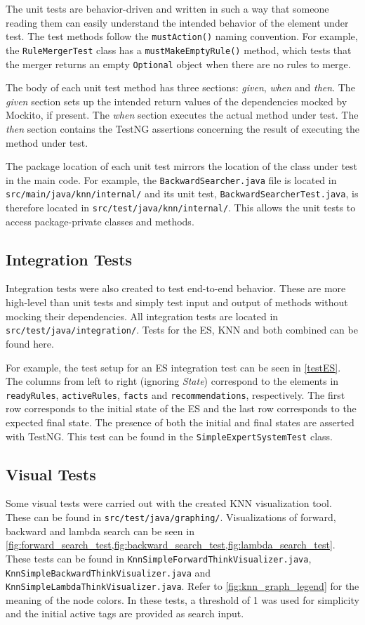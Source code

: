 \documentclass[titlepage,11pt]{article}
\newcommand{\code}[1]{\texttt{#1}}
\begin{document}
The unit tests are behavior-driven and written in such a way that someone reading them can easily understand the intended behavior of the element under test. The test methods follow the \code{mustAction()} naming convention. For example, the \code{RuleMergerTest} class has a \code{mustMakeEmptyRule()} method, which tests that the merger returns an empty \code{Optional} object when there are no rules to merge.

The body of each unit test method has three sections: \emph{given}, \emph{when} and \emph{then}. The \emph{given} section sets up the intended return values of the dependencies mocked by Mockito, if present. The \emph{when} section executes the actual method under test. The \emph{then} section contains the TestNG assertions concerning the result of executing the method under test.

The package location of each unit test mirrors the location of the class under test in the main code. For example, the \code{BackwardSearcher.java} file is located in \code{src/main/java/knn/internal/} and its unit test, \code{BackwardSearcherTest.java}, is therefore located in \code{src/test/java/knn/internal/}. This allows the unit tests to access package-private classes and methods.

\subsection{Integration Tests}
Integration tests were also created to test end-to-end behavior. These are more high-level than unit tests and simply test input and output of methods without mocking their dependencies. All integration tests are located in \code{src/test/java/integration/}. Tests for the ES, KNN and both combined can be found here.

For example, the test setup for an ES integration test can be seen in \autoref{testES}. The columns from left to right (ignoring \emph{State}) correspond to the elements in \code{readyRules}, \code{activeRules}, \code{facts} and \code{recommendations}, respectively. The first row corresponds to the initial state of the ES and the last row corresponds to the expected final state. The presence of both the initial and final states are asserted with TestNG. This test can be found in the \code{SimpleExpertSystemTest} class.

\subsection{Visual Tests}
Some visual tests were carried out with the created KNN visualization tool. These can be found in \code{src/test/java/graphing/}. Visualizations of forward, backward and lambda search can be seen in \cref{fig:forward_search_test,fig:backward_search_test,fig:lambda_search_test}. These tests can be found in \code{KnnSimpleForwardThinkVisualizer.java}, \code{KnnSimpleBackwardThinkVisualizer.java} and \code{KnnSimpleLambdaThinkVisualizer.java}. Refer to \cref{fig:knn_graph_legend} for the meaning of the node colors. In these tests, a threshold of 1 was used for simplicity and the initial active tags are provided as search input.
\end{document}

